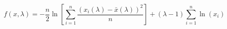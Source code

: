 

\[
f(x,\lambda) = -\frac{n}{2} \ln[\sum_{i=1}^{n}{\frac{(x_i(\lambda) - \bar{x}(\lambda))^2}{n}}] + (\lambda - 1)\sum_{i=1}^{n}{\ln(x_i)}
\]


